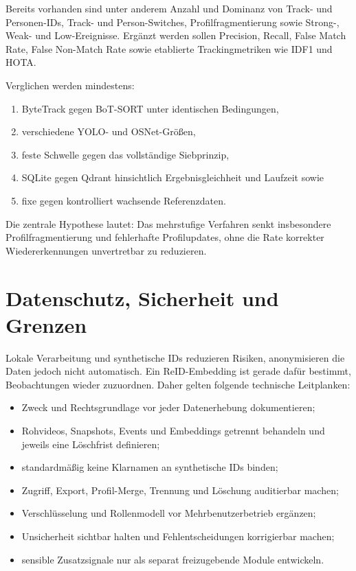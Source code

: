 Bereits vorhanden sind unter anderem Anzahl und Dominanz von Track- und
Personen-IDs, Track- und Person-Switches, Profilfragmentierung sowie Strong-,
Weak- und Low-Ereignisse. Ergänzt werden sollen Precision, Recall, False Match
Rate, False Non-Match Rate sowie etablierte Trackingmetriken wie IDF1 und HOTA.

Verglichen werden mindestens:

\begin{enumerate}[leftmargin=8mm]
  \item ByteTrack gegen BoT-SORT unter identischen Bedingungen,
  \item verschiedene YOLO- und OSNet-Größen,
  \item feste Schwelle gegen das vollständige Siebprinzip,
  \item SQLite gegen Qdrant hinsichtlich Ergebnisgleichheit und Laufzeit sowie
  \item fixe gegen kontrolliert wachsende Referenzdaten.
\end{enumerate}

Die zentrale Hypothese lautet: Das mehrstufige Verfahren senkt insbesondere
Profilfragmentierung und fehlerhafte Profilupdates, ohne die Rate korrekter
Wiedererkennungen unvertretbar zu reduzieren.


\section{Datenschutz, Sicherheit und Grenzen}

Lokale Verarbeitung und synthetische IDs reduzieren Risiken, anonymisieren die
Daten jedoch nicht automatisch. Ein ReID-Embedding ist gerade dafür bestimmt,
Beobachtungen wieder zuzuordnen. Daher gelten folgende technische Leitplanken:

\begin{itemize}[leftmargin=7mm]
  \item Zweck und Rechtsgrundlage vor jeder Datenerhebung dokumentieren;
  \item Rohvideos, Snapshots, Events und Embeddings getrennt behandeln und
    jeweils eine Löschfrist definieren;
  \item standardmäßig keine Klarnamen an synthetische IDs binden;
  \item Zugriff, Export, Profil-Merge, Trennung und Löschung auditierbar machen;
  \item Verschlüsselung und Rollenmodell vor Mehrbenutzerbetrieb ergänzen;
  \item Unsicherheit sichtbar halten und Fehlentscheidungen korrigierbar machen;
  \item sensible Zusatzsignale nur als separat freizugebende Module entwickeln.
\end{itemize}

